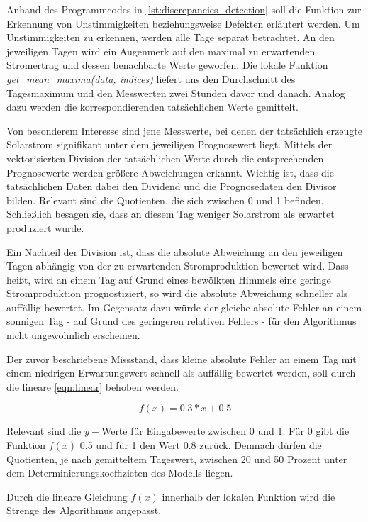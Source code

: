 \documentclass[12pt, a4paper]{article}
\begin{document}
Anhand des Programmcodes in  \autoref{lst:discrepancies_detection} soll die Funktion zur Erkennung von Unstimmigkeiten beziehungsweise Defekten erläutert werden. Um Unstimmigkeiten zu erkennen, werden alle Tage separat betrachtet. An den jeweiligen Tagen wird ein Augenmerk auf den maximal zu erwartenden Stromertrag und dessen benachbarte Werte geworfen. Die lokale Funktion \textit{get\_mean\_maxima(data, indices)} liefert uns den Durchschnitt des Tagesmaximum und den Messwerten zwei Stunden davor und danach. Analog dazu werden die korrespondierenden tatsächlichen Werte gemittelt.

Von besonderem Interesse sind jene Messwerte, bei denen der tatsächlich erzeugte Solarstrom signifikant unter dem jeweiligen Prognosewert liegt. Mittels der vektorisierten Division der tatsächlichen Werte durch die entsprechenden Prognosewerte werden größere Abweichungen erkannt. Wichtig ist, dass die tatsächlichen Daten dabei den Dividend und die Prognosedaten den Divisor bilden. Relevant sind die Quotienten, die sich zwischen 0 und 1 befinden. Schließlich besagen sie, dass an diesem Tag weniger Solarstrom als erwartet produziert wurde.

Ein Nachteil der Division ist, dass die absolute Abweichung an den jeweiligen Tagen abhängig von der zu erwartenden Stromproduktion bewertet wird. Dass heißt, wird an einem Tag auf Grund eines bewölkten Himmels eine geringe Stromproduktion prognostiziert, so wird die absolute Abweichung schneller als auffällig bewertet. Im Gegensatz dazu würde der gleiche absolute Fehler an einem sonnigen Tag - auf Grund des geringeren relativen Fehlers - für den Algorithmus nicht ungewöhnlich erscheinen.

Der zuvor beschriebene Missstand, dass kleine absolute Fehler an einem Tag mit einem niedrigen Erwartungswert schnell als auffällig bewertet werden, soll durch die lineare \autoref{eqn:linear} behoben werden.

\begin{equation}
\label{eqn:linear}
f(x)=0.3*x+0.5
\end{equation}

Relevant sind die $y-$Werte für Eingabewerte zwischen 0 und 1. Für 0 gibt die Funktion $f(x)$ 0.5 und für 1 den Wert 0.8 zurück. Demnach dürfen die Quotienten, je nach gemitteltem Tageswert, zwischen 20 und 50 Prozent unter dem Determinierungskoeffizieten des Modells liegen.



Durch die lineare Gleichung $f(x)$ innerhalb der lokalen Funktion wird die Strenge des Algorithmus angepasst. 
\end{document}
